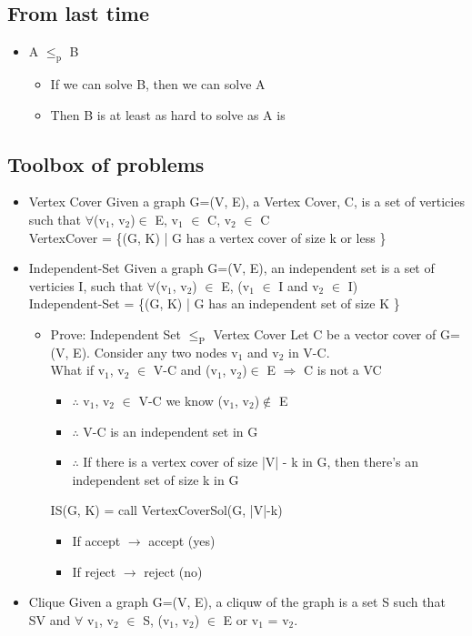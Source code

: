 \documentclass[11pt]{article}
\begin{document}
\subsection{From last time}
\label{sec:org5e61a02}
\begin{itemize}
\item A \(\le_{\text{p}}\) B
\begin{itemize}
\item If we can solve B, then we can solve A
\item Then B is at least as hard to solve as A is
\end{itemize}
\end{itemize}
\subsection{Toolbox of problems}
\label{sec:orga9c8542}
\begin{itemize}
\item Vertex Cover
Given a graph G=(V, E), a Vertex Cover, C, is a set of verticies such that \(\forall\)(v\(_{\text{1}}\), v\(_{\text{2}}\))\(\in\) E, v\(_{\text{1}}\) \(\in\) C, v\(_{\text{2}}\) \(\in\) C\\
VertexCover = \{(G, K) | G has a vertex cover of size k or less \}
\item Independent-Set
Given a graph G=(V, E), an independent set is a set of verticies I, such that \(\forall\)(v\(_{\text{1}}\), v\(_{\text{2}}\)) \(\in\) E, \textlnot{}(v\(_{\text{1}}\) \(\in\) I and v\(_{\text{2}}\) \(\in\) I)\\
Independent-Set = \{(G, K) | G has an independent set of size K \}
\begin{itemize}
\item Prove: Independent Set \(\le_{\text{P}}\) Vertex Cover
Let C be a vector cover of G=(V, E). Consider any two nodes v\(_{\text{1}}\) and v\(_{\text{2}}\) in V-C.\\
What if v\(_{\text{1}}\), v\(_{\text{2}}\) \(\in\) V-C and (v\(_{\text{1}}\), v\(_{\text{2}}\))\(\in\) E \(\Rightarrow\) C is not a VC
\begin{itemize}
\item \(\therefore\) v\(_{\text{1}}\), v\(_{\text{2}}\) \(\in\) V-C we know (v\(_{\text{1}}\), v\(_{\text{2}}\))\(\notin\) E
\item \(\therefore\) V-C is an independent set in G
\item \(\therefore\) If there is a vertex cover of size |V| - k in G, then there's an independent set of size k in G
\end{itemize}
IS(G, K) = call VertexCoverSol(G, |V|-k)
\begin{itemize}
\item If accept \(\rightarrow\) accept (yes)
\item If reject \(\rightarrow\) reject (no)
\end{itemize}
\end{itemize}
\item Clique
Given a graph G=(V, E), a cliquw of the graph is a set S such that S\subseteq{}V and \(\forall\) v\(_{\text{1}}\), v\(_{\text{2}}\) \(\in\) S, 
(v\(_{\text{1}}\), v\(_{\text{2}}\)) \(\in\) E or v\(_{\text{1}}\) = v\(_{\text{2}}\).
\end{itemize}
\end{document}
